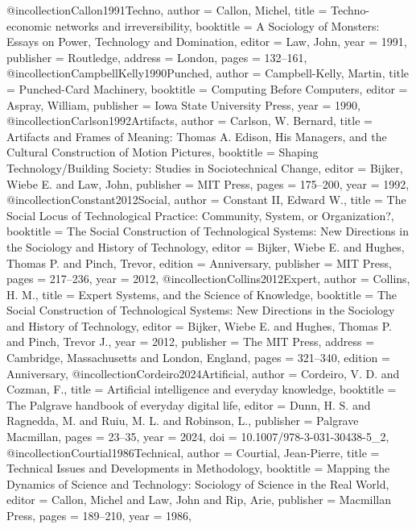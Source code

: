 @incollection{Callon1991Techno,
  author    = {Callon, Michel},
  title     = {{Techno-economic networks and irreversibility}},
  booktitle = {{A Sociology of Monsters: Essays on Power, Technology and Domination}},
  editor    = {Law, John},
  year      = {1991},
  publisher = {Routledge},
  address   = {London},
  pages     = {132--161},
}
@incollection{CampbellKelly1990Punched,
  author    = {Campbell-Kelly, Martin},
  title     = {{Punched-Card Machinery}},
  booktitle = {{Computing Before Computers}},
  editor    = {Aspray, William},
  publisher = {Iowa State University Press},
  year      = {1990},
}
@incollection{Carlson1992Artifacts,
  author    = {Carlson, W. Bernard},
  title     = {{Artifacts and Frames of Meaning: Thomas A. Edison, His Managers, and the Cultural Construction of Motion Pictures}},
  booktitle = {{Shaping Technology/Building Society: Studies in Sociotechnical Change}},
  editor    = {Bijker, Wiebe E. and Law, John},
  publisher = {MIT Press},
  pages     = {175--200},
  year      = {1992},
}
@incollection{Constant2012Social,
  author    = {Constant II, Edward W.},
  title     = {{The Social Locus of Technological Practice: Community, System, or Organization?}},
  booktitle = {{The Social Construction of Technological Systems: New Directions in the Sociology and History of Technology}},
  editor    = {Bijker, Wiebe E. and Hughes, Thomas P. and Pinch, Trevor},
  edition   = {Anniversary},
  publisher = {MIT Press},
  pages     = {217--236},
  year      = {2012},
}
@incollection{Collins2012Expert,
  author    = {Collins, H. M.},
  title     = {Expert Systems, and the Science of Knowledge},
  booktitle = {The Social Construction of Technological Systems: New Directions in the Sociology and History of Technology},
  editor    = {Bijker, Wiebe E. and Hughes, Thomas P. and Pinch, Trevor J.},
  year      = {2012},
  publisher = {The MIT Press},
  address   = {Cambridge, Massachusetts and London, England},
  pages     = {321--340},
  edition   = {Anniversary},
}
@incollection{Cordeiro2024Artificial,
  author    = {Cordeiro, V. D. and Cozman, F.},
  title     = {Artificial intelligence and everyday knowledge},
  booktitle = {The Palgrave handbook of everyday digital life},
  editor    = {Dunn, H. S. and Ragnedda, M. and Ruiu, M. L. and Robinson, L.},
  publisher = {Palgrave Macmillan},
  pages     = {23--35},
  year      = {2024},
  doi       = {10.1007/978-3-031-30438-5_2},
}
@incollection{Courtial1986Technical,
  author    = {Courtial, Jean-Pierre},
  title     = {{Technical Issues and Developments in Methodology}},
  booktitle = {{Mapping the Dynamics of Science and Technology: Sociology of Science in the Real World}},
  editor    = {Callon, Michel and Law, John and Rip, Arie},
  publisher = {Macmillan Press},
  pages     = {189--210},
  year      = {1986},
}

